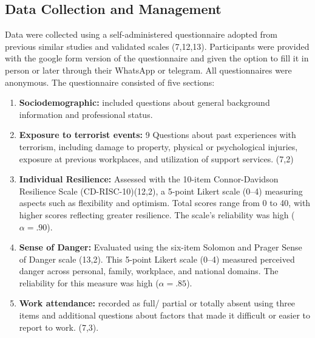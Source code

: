 \documentclass[12pt]{article}
\begin{document}
\subsection{Data Collection and Management}
Data were collected using a self-administered questionnaire adopted from previous similar studies and validated scales (7,12,13). Participants were provided with the google form version of the questionnaire and given the option to fill it in person or later through their WhatsApp or telegram. All questionnaires were anonymous. The questionnaire consisted of five sections:
\begin{enumerate}[noitemsep]
\item \textbf{Sociodemographic:} included questions about general background information and professional status.
\item \textbf{Exposure to terrorist events:} 9 Questions about past experiences with terrorism, including damage to property, physical or psychological injuries, exposure at previous workplaces, and utilization of support services. (7,2)
\item \textbf{Individual Resilience:} Assessed with the 10-item Connor-Davidson Resilience Scale (CD-RISC-10)(12,2), a 5-point Likert scale (0–4) measuring aspects such as flexibility and optimism. Total scores range from 0 to 40, with higher scores reflecting greater resilience. The scale's reliability was high ($\alpha = .90$).
\item \textbf{Sense of Danger:} Evaluated using the six-item Solomon and Prager Sense of Danger scale (13,2). This 5-point Likert scale (0–4) measured perceived danger across personal, family, workplace, and national domains. The reliability for this measure was high ($\alpha = .85$).
\item \textbf{Work attendance:} recorded as full/ partial or totally absent using three items and additional questions about factors that made it difficult or easier to report to work. (7,3).
\end{enumerate}
\end{document}
